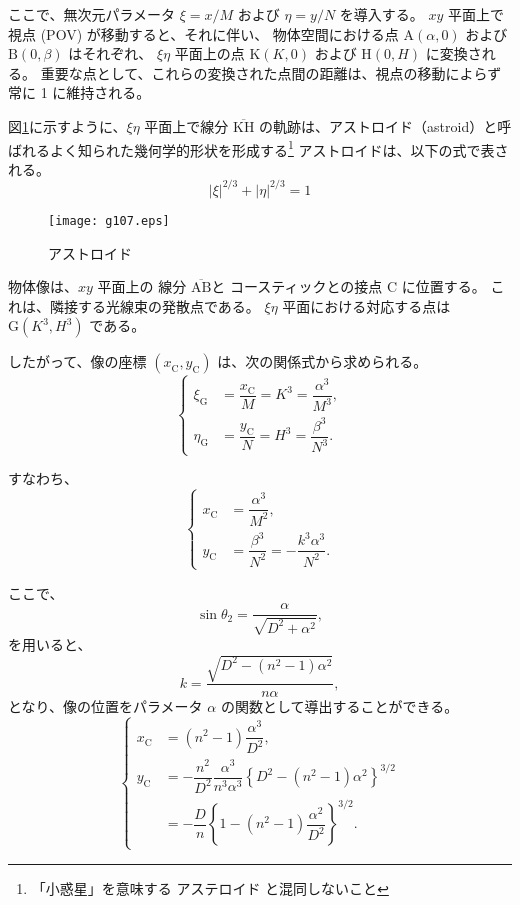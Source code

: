 \documentclass[twocolumn]{article}
\begin{document}
ここで、無次元パラメータ $\xi=x/M$ および $\eta=y/N$ を導入する。 
$xy$ 平面上で視点 (POV) が移動すると、それに伴い、 
物体空間における点 $\mathrm{A}(\alpha, 0)$ および $\mathrm{B}(0, \beta)$ はそれぞれ、 
$\xi\eta$ 平面上の点 $\mathrm{K}(K, 0)$ および $\mathrm{H}(0, H)$ に変換される。 
重要な点として、これらの変換された点間の距離は、視点の移動によらず常に 1 に維持される。

図\ref{fig:astroid}に示すように、$\xi\eta$ 平面上で線分 $\overline{\mathrm{KH}}$ の軌跡は、アストロイド（astroid）と呼ばれるよく知られた幾何学的形状を形成する\footnote{「小惑星」を意味する アステロイド と混同しないこと} 
アストロイドは、以下の式で表される。
$$ \left| \xi \right|^{2/3} + \left| \eta \right|^{2/3} = 1 $$

\begin{figure}
	\centering
	\texttt{[image: g107.eps]}
	\caption{アストロイド}
	\label{fig:astroid}
\end{figure}

物体像は、$xy$ 平面上の 線分 $\overline{\mathrm{AB}}$と コースティックとの接点 C に位置する。 
これは、隣接する光線束の発散点である。 
$\xi\eta$ 平面における対応する点は $\mathrm{G}(K^3, H^3)$ である。

したがって、像の座標 $(x_{\mathrm{C}}^{}, y_{\mathrm{C}}^{})$ は、次の関係式から求められる。
$$ \left\{ 
\begin{aligned}
	\xi_{\mathrm{G}}^{} &= \dfrac{x_{\mathrm{C}}^{}}{M} = K^3 = \dfrac{\alpha^3}{M^3},\\
	\eta_{\mathrm{G}}^{} &= \dfrac{y_{\mathrm{C}}^{}}{N} = H^3 = \dfrac{\beta^3}{N^3}.
\end{aligned}
\right.$$

すなわち、
$$ \left\{ 
\begin{aligned}
	x_{\mathrm{C}}^{} &= \dfrac{\alpha^3}{M^2},\\
	y_{\mathrm{C}}^{} &= \dfrac{\beta^3}{N^2}=-\dfrac{k^3\alpha^3}{N^2}.
\end{aligned}
\right.$$

ここで、
$$\sin\theta_2 = \dfrac{\alpha}{\sqrt{D^2+\alpha^2}},$$
を用いると、
$$k = \dfrac{\sqrt{D^2-(n^2-1)\alpha^2}}{n\alpha},$$
となり、像の位置をパラメータ $\alpha$ の関数として導出することができる。
$$ \left\{ 
\begin{aligned}
	x_{\mathrm{C}}^{} &= (n^2-1)\dfrac{\alpha^3}{D^2},\\
	y_{\mathrm{C}}^{} &= -\dfrac{n^2}{D^2}\dfrac{\alpha^3}{n^3\alpha^3}\left\{ D^2-(n^2-1)\alpha^2 \right\}^{3/2}\\
	&=-\dfrac{D}{n}\left\{ 1-(n^2-1)\dfrac{\alpha^2}{D^2} \right\}^{3/2}.
\end{aligned}
\right.$$
\end{document}
